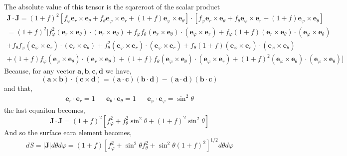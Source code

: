 The absolute value of this tensor is the sqareroot of the scalar product 
\begin{multline}
    \textbf{J}\cdot \textbf{J}
    = 
    (1 + f)^2[
        f_\varphi \textbf{e}_r \times \textbf{e}_{\theta}
        + f_\theta  \textbf{e}_{\varphi} \times \textbf{e}_r
        + (1 + f) \textbf{e}_{\varphi}\times \textbf{e}_{\theta}
    ]
    \cdot [
        f_\varphi \textbf{e}_r \times \textbf{e}_{\theta}
        + f_\theta  \textbf{e}_{\varphi} \times \textbf{e}_r
        + (1 + f) \textbf{e}_{\varphi}\times \textbf{e}_{\theta}
    ]\\
    =
    (1 + f)^2[
        f_\varphi^2 (\textbf{e}_r \times \textbf{e}_{\theta})\cdot (\textbf{e}_r \times \textbf{e}_{\theta})
        + f_\varphi f_\theta (\textbf{e}_r \times \textbf{e}_{\theta})\cdot (\textbf{e}_{\varphi} \times \textbf{e}_r)
        + f_\varphi (1 + f) (\textbf{e}_r \times \textbf{e}_{\theta})\cdot (\textbf{e}_{\varphi}\times \textbf{e}_{\theta})
        \\
        + f_\theta f_\varphi  (\textbf{e}_{\varphi} \times \textbf{e}_r)\cdot (\textbf{e}_r \times \textbf{e}_{\theta})
        + f_\theta^2   (\textbf{e}_{\varphi} \times \textbf{e}_r)\cdot (\textbf{e}_{\varphi} \times \textbf{e}_r)
        + f_\theta (1+f)   (\textbf{e}_{\varphi} \times \textbf{e}_r)\cdot  (\textbf{e}_{\varphi}\times \textbf{e}_{\theta}) \\
        + (1 + f)f_\varphi (\textbf{e}_{\varphi}\times \textbf{e}_{\theta})\cdot (\textbf{e}_r \times \textbf{e}_{\theta})
        + (1 + f)f_\theta (\textbf{e}_{\varphi}\times \textbf{e}_{\theta})\cdot (\textbf{e}_{\varphi} \times \textbf{e}_r)
        + (1 + f)^2 (\textbf{e}_{\varphi}\times \textbf{e}_{\theta})\cdot(\textbf{e}_{\varphi}\times \textbf{e}_{\theta})
    ]
\end{multline}
Because, for any vector $\textbf{a}, \textbf{b}, \textbf{c}, \textbf{d}$ we have, 
\begin{equation}
    (\textbf{a}\times \textbf{b})
    \cdot (\textbf{c}\times \textbf{d})
    =
    (\textbf{a}\cdot \textbf{c})
    (\textbf{b}\cdot \textbf{d})
    -
    (\textbf{a}\cdot \textbf{d})
    (\textbf{b}\cdot \textbf{c})
\end{equation}
and that,
\begin{align}
    \textbf{e}_r\cdot \textbf{e}_r=1 
    &&\textbf{e}_\theta\cdot \textbf{e}_\theta=1 
    &&\textbf{e}_\varphi\cdot \textbf{e}_\varphi=\sin^2\theta
\end{align}
the last equaiton becomes, 
\begin{equation}
    \textbf{J}\cdot \textbf{J}
    =
    (1 + f)^2[
        f_\varphi^2 
        + f_\theta^2\sin^2\theta  
        + (1 + f)^2\sin^2\theta  
    ]
\end{equation}
And so the surface eara element becomes, 
\begin{equation}
    dS 
    =
    |\textbf{J}| d\theta d\varphi 
    =
    (1 + f)[
        f_\varphi^2 
        + \sin^2\theta f_\theta^2  
        + \sin^2\theta(1 + f)^2
    ]^{1/2}
    d\theta d \varphi
\end{equation}

